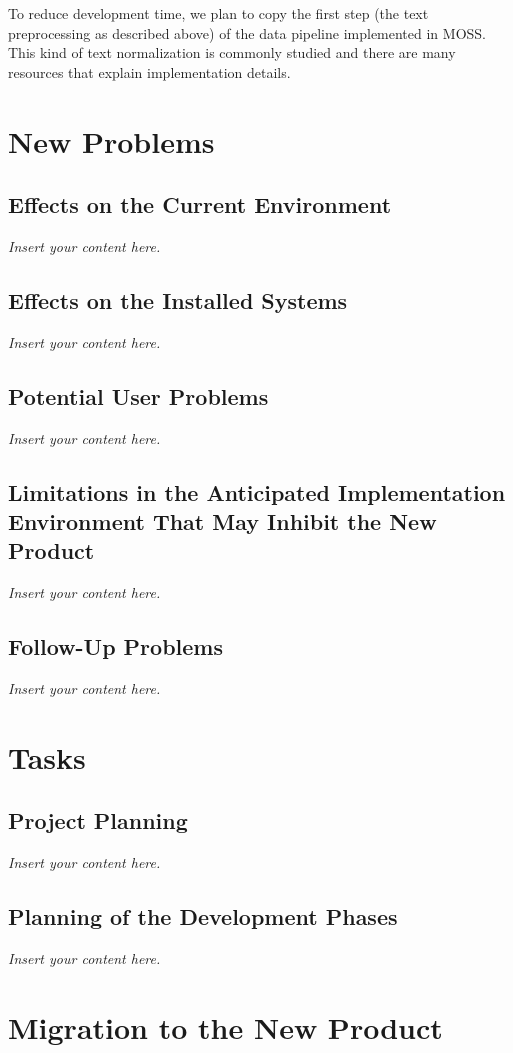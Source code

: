 \documentclass[12pt]{article}
\newcommand{\lips}{\textit{Insert your content here.}}
\begin{document}
To reduce development time, we plan to copy the first step (the text preprocessing as described above) of the data pipeline implemented in MOSS. This kind of text normalization is commonly studied and there are many resources that explain implementation details.

\section{New Problems}
\subsection{Effects on the Current Environment}
\lips
\subsection{Effects on the Installed Systems}
\lips
\subsection{Potential User Problems}
\lips
\subsection{Limitations in the Anticipated Implementation Environment That May
Inhibit the New Product}
\lips
\subsection{Follow-Up Problems}
\lips

\section{Tasks}
\subsection{Project Planning}
\lips
\subsection{Planning of the Development Phases}
\lips

\section{Migration to the New Product}
\end{document}
